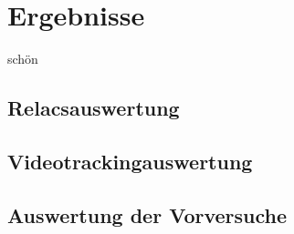 \chapter{Ergebnisse}
schön
\section{Relacsauswertung}


\section{Videotrackingauswertung}


\section{Auswertung der Vorversuche}
